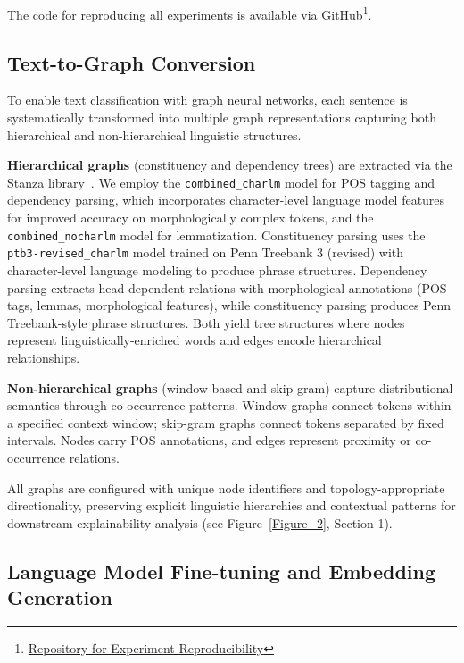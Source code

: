 \documentclass[preprint, times, review, 10pt]{elsarticle}
\begin{document}
The code for reproducing all experiments is available via GitHub\footnote{\href{https://anonymous.4open.science/r/Graph-Neural-Networks-Enable-Superior-Error-Detection-in-NLP-Explainability-than-Language-Models-A792/README.md}{Repository for Experiment Reproducibility}}.

\subsection{Text-to-Graph Conversion} \label{data_preprocessing}

To enable text classification with graph neural networks, each sentence is systematically transformed into multiple graph representations capturing both hierarchical and non-hierarchical linguistic structures.

\textbf{Hierarchical graphs} (constituency and dependency trees) are extracted via the Stanza library~\cite{qi2020stanza}. We employ the \texttt{combined\_charlm} model for POS tagging and dependency parsing, which incorporates character-level language model features for improved accuracy on morphologically complex tokens, and the \texttt{combined\_nocharlm} model for lemmatization. Constituency parsing uses the \texttt{ptb3-revised\_charlm} model trained on Penn Treebank 3 (revised) with character-level language modeling to produce phrase structures. Dependency parsing extracts head-dependent relations with morphological annotations (POS tags, lemmas, morphological features), while constituency parsing produces Penn Treebank-style phrase structures. Both yield tree structures where nodes represent linguistically-enriched words and edges encode hierarchical relationships.


\textbf{Non-hierarchical graphs} (window-based and skip-gram) capture distributional semantics through co-occurrence patterns. Window graphs connect tokens within a specified context window; skip-gram graphs connect tokens separated by fixed intervals. Nodes carry POS annotations, and edges represent proximity or co-occurrence relations.

All graphs are configured with unique node identifiers and topology-appropriate directionality, preserving explicit linguistic hierarchies and contextual patterns for downstream explainability analysis (see Figure~\ref{Figure_2}, Section 1).


\subsection{Language Model Fine-tuning and Embedding Generation} \label{fine-tuning}
\end{document}

